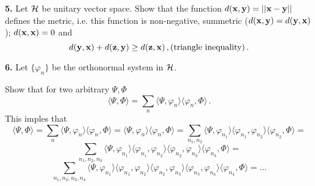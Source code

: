 \m

{\bf 5.} Let $\cal H$ be unitary vector space.
 Show that the function $d({\bf x},{\bf y})=||{\bf x}-{\bf y}||$ defines the metric,
i.e.  this function is non-negative, summetric ($d({\bf x},{\bf y})=d({\bf y},{\bf x})$);
 $d({\bf x},{\bf x})=0$ and
                  $$
       d({\bf y},{\bf x})+d({\bf z},{\bf y})\geq d({\bf z},{\bf x})\,, \hbox {(triangle inequality)}\,.
                  $$

    

\m



{\bf 6.} Let $\{\varphi_n\}$ be the orthonormal system in $\cal H$.

           Show that for two arbitrary $\Psi,\Phi$
                $$
\langle\Psi,\Phi\rangle=
\sum_n\langle\Psi,\varphi_n\rangle
\langle\varphi_n,\Phi\rangle\,.
                $$
This imples that 
                $$
\langle\Psi,\Phi\rangle=
\sum_n\langle\Psi,\varphi_n\rangle
\langle\varphi_n,\Phi\rangle
    =
\langle\Psi,\varphi_{n}\rangle
\langle\varphi_{n},\Phi\rangle
            =
\sum_{n_1,n_2}
\langle\Psi,\varphi_{n_1}\rangle
\langle\varphi_{n_1},\varphi_{n_2}\rangle
\langle\varphi_{n_2},\Phi\rangle
                 =
                $$
                 $$
\sum_{n_1,n_2,n_3}
\langle\Psi,\varphi_{n_1}\rangle
\langle\varphi_{n_1},\varphi_{n_2}\rangle
\langle\varphi_{n_2},\varphi_{n_3}\rangle
\langle\varphi_{n_3},\Phi\rangle
                =
                     $$
                 $$
\sum_{n_1,n_2,n_3,n_4}
\langle\Psi,\varphi_{n_1}\rangle
\langle\varphi_{n_1},\varphi_{n_2}\rangle
\langle\varphi_{n_2},\varphi_{n_3}\rangle
\langle\varphi_{n_3},\varphi_{n_4}\rangle
\langle\varphi_{n_4},\Phi\rangle=\dots
                     $$





\bye
